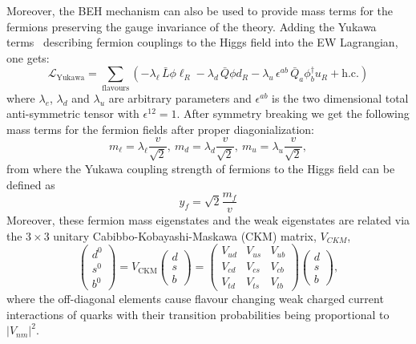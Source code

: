 Moreover, the BEH mechanism can also be used to provide mass terms for the fermions preserving the gauge invariance of the theory.
Adding the Yukawa terms~\cite{Peskin} describing fermion couplings to the Higgs field into the EW Lagrangian, one gets:
\begin{equation}
\mathcal{L}_{\text{Yukawa}} = 
\sum_{\text{flavours}} \left( 
- \lambda_\ell \, \bar{L} \phi \ell_R 
- \lambda_d \, \bar{Q} \phi d_R 
- \lambda_u \, \epsilon^{ab} \, \bar{Q}_a \phi_b^{\dagger} u_R 
+ \text{h.c.} 
\right)
\end{equation}
where $\lambda_{e}$, $\lambda_{d}$ and $\lambda_{u}$ are arbitrary parameters and $\epsilon^{ab}$ is the two dimensional total anti-symmetric tensor with $\epsilon^{12}=1$. After symmetry breaking we get the following mass terms for the fermion fields after proper diagonialization: 
\begin{equation}
m_{\ell}=\lambda_{\ell}\frac{v}{\sqrt{2}}, \ m_{d}=\lambda_{d}\frac{v}{\sqrt{2}}, \ m_{u}=\lambda_{u}\frac{v}{\sqrt{2}},
\end{equation}
from where the Yukawa coupling strength of fermions to the Higgs field can be defined as
\begin{equation}
\label{yukawa}
y_{f}=\sqrt{2}\frac{m_{f}}{v}
\end{equation}
Moreover, these fermion mass eigenstates and the weak eigenstates are related via the $3\times3$ unitary Cabibbo-Kobayashi-Maskawa (CKM) matrix, $V_{CKM}$,
\begin{equation}
\begin{pmatrix}
d^0 \\
s^0 \\
b^0
\end{pmatrix}
= V_{\text{CKM}}
\begin{pmatrix}
d \\
s \\
b
\end{pmatrix}
=\begin{pmatrix}
V_{ud} & V_{us} & V_{ub} \\
V_{cd} & V_{cs} & V_{cb} \\
V_{td} & V_{ts} & V_{tb}
\end{pmatrix}
\begin{pmatrix}
d \\
s \\
b
\end{pmatrix},
\end{equation}
where the off-diagonal elements cause flavour changing weak charged current interactions of quarks with their transition probabilities being proportional to $|V_{nm}|^2$.

